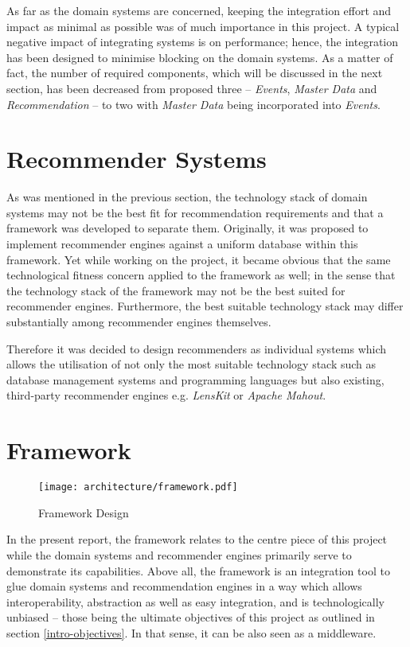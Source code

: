 As far as the domain systems are concerned, keeping the integration effort and impact as minimal as possible was of much importance in this project. A typical negative impact of integrating systems is on performance; hence, the integration has been designed to minimise blocking on the domain systems. As a matter of fact, the number of required components, which will be discussed in the next section, has been decreased from proposed three -- \emph{Events}, \emph{Master Data} and \emph{Recommendation} -- to two with \emph{Master Data} being incorporated into \emph{Events}.

\section{Recommender Systems}
\label{architecture-recommender-systems}

As was mentioned in the previous section, the technology stack of domain systems may not be the best fit for recommendation requirements and that a framework was developed to separate them. Originally, it was proposed to implement recommender engines against a uniform database within this framework. Yet while working on the project, it became obvious that the same technological fitness concern applied to the framework as well; in the sense that the technology stack of the framework may not be the best suited for recommender engines. Furthermore, the best suitable technology stack may differ substantially among recommender engines themselves.

Therefore it was decided to design recommenders as individual systems which allows the utilisation of not only the most suitable technology stack such as database management systems and programming languages but also existing, third-party recommender engines e.g. \emph{LensKit} or \emph{Apache Mahout}.

\section{Framework}
\label{architecture-framework}

\begin{figure}[ht]
    \texttt{[image: architecture/framework.pdf]}
    \caption{Framework Design}
    \label{fig:architecture-framework}
\end{figure}

In the present report, the framework relates to the centre piece of this project while the domain systems and recommender engines primarily serve to demonstrate its capabilities. Above all, the framework is an integration tool to glue domain systems and recommendation engines in a way which allows interoperability, abstraction as well as easy integration, and is technologically unbiased -- those being the ultimate objectives of this project as outlined in section \ref{intro-objectives}. In that sense, it can be also seen as a middleware.


